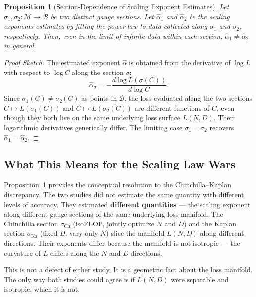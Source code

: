 \documentclass[12pt,a4paper]{article}
\newtheorem{proposition}[theorem]{Proposition}
\theoremstyle{remark}
\newcommand{\Loss}{L}
\begin{document}
\begin{proposition}[Section-Dependence of Scaling Exponent Estimates]
\label{prop:section_dep}
Let $\sigma_1, \sigma_2: \mathcal{M} \to \mathcal{B}$ be two distinct gauge sections. Let $\hat{\alpha}_1$ and $\hat{\alpha}_2$ be the scaling exponents estimated by fitting the power law to data collected along $\sigma_1$ and $\sigma_2$, respectively. Then, even in the limit of infinite data within each section, $\hat{\alpha}_1 \neq \hat{\alpha}_2$ in general.
\end{proposition}

\begin{proof}[Proof Sketch]
The estimated exponent $\hat{\alpha}$ is obtained from the derivative of $\log \Loss$ with respect to $\log C$ along the section $\sigma$:
\begin{equation}
\hat{\alpha}_\sigma = -\frac{d \log \Loss(\sigma(C))}{d \log C}.
\end{equation}
Since $\sigma_1(C) \neq \sigma_2(C)$ as points in $\mathcal{B}$, the loss evaluated along the two sections $C \mapsto \Loss(\sigma_1(C))$ and $C \mapsto \Loss(\sigma_2(C))$ are different functions of $C$, even though they both live on the same underlying loss surface $\Loss(N, D)$. Their logarithmic derivatives generically differ. The limiting case $\sigma_1 = \sigma_2$ recovers $\hat{\alpha}_1 = \hat{\alpha}_2$.
\end{proof}

\subsection{What This Means for the Scaling Law Wars}

Proposition~\ref{prop:section_dep} provides the conceptual resolution to the Chinchilla--Kaplan discrepancy. The two studies did not estimate the same quantity with different levels of accuracy. They estimated \textbf{different quantities} — the scaling exponent along different gauge sections of the same underlying loss manifold. The Chinchilla section $\sigma_{\text{Ch}}$ (isoFLOP, jointly optimize $N$ and $D$) and the Kaplan section $\sigma_{\text{Ka}}$ (fixed $D$, vary only $N$) slice the manifold $\Loss(N, D)$ along different directions. Their exponents differ because the manifold is not isotropic — the curvature of $\Loss$ differs along the $N$ and $D$ directions.

This is not a defect of either study. It is a geometric fact about the loss manifold. The only way both studies could agree is if $\Loss(N, D)$ were separable and isotropic, which it is not.
\end{document}
